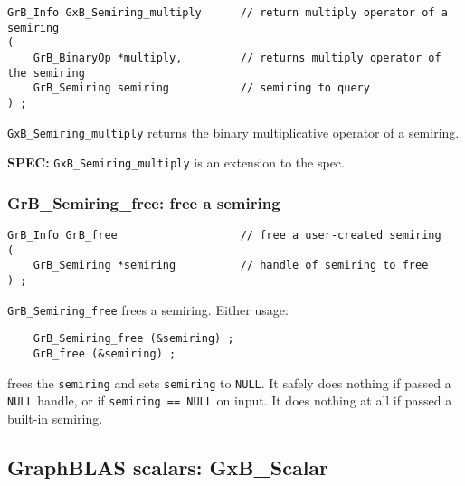 \documentclass[12pt]{article}
\begin{document}
\begin{mdframed}[userdefinedwidth=6in]
{\footnotesize
\begin{verbatim}
GrB_Info GxB_Semiring_multiply      // return multiply operator of a semiring
(
    GrB_BinaryOp *multiply,         // returns multiply operator of the semiring
    GrB_Semiring semiring           // semiring to query
) ;
\end{verbatim}
} \end{mdframed}

\verb'GxB_Semiring_multiply' returns the binary multiplicative operator of a
semiring.

\begin{spec}
{\bf SPEC:} \verb'GxB_Semiring_multiply' is an extension to the spec.
\end{spec}


\subsubsection{{\sf GrB\_Semiring\_free:} free a semiring}
\label{semiring_free}

\begin{mdframed}[userdefinedwidth=6in]
{\footnotesize
\begin{verbatim}
GrB_Info GrB_free                   // free a user-created semiring
(
    GrB_Semiring *semiring          // handle of semiring to free
) ;
\end{verbatim}
} \end{mdframed}

\verb'GrB_Semiring_free' frees a semiring.  Either usage:

    {\small
    \begin{verbatim}
    GrB_Semiring_free (&semiring) ;
    GrB_free (&semiring) ; \end{verbatim}}

\noindent
frees the \verb'semiring' and sets \verb'semiring' to \verb'NULL'.  It safely
does nothing if passed a \verb'NULL' handle, or if \verb'semiring == NULL' on
input.  It does nothing at all if passed a built-in semiring.

\newpage
\subsection{GraphBLAS scalars: {\sf GxB\_Scalar}} %
\label{scalar}
\end{document}
